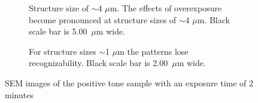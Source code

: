 \begin{figure}[ht]
\begin{subfigure}[t]{0.24\linewidth}
    	\label{fig:b2d7_q7}
    \end{subfigure}
    \hfill
    \begin{subfigure}[t]{0.24\linewidth}
    	\centering
    	\caption{Structure size of $\sim$4 $\mu$m. The effects of overexposure become pronounced at structure sizes of $\sim$4 $\mu$m. Black scale bar is 5.00~$\mu$m wide.}
    	\label{fig:b2d9_q9}
    \end{subfigure}
    \hfill
    \begin{subfigure}[t]{0.24\linewidth}
    	\centering
    	\caption{For structure sizes $\sim$1 $\mu$m the patterns lose recognizability. Black scale bar is 2.00~$\mu$m wide.}
    	\label{fig:b2d10_q11}
    \end{subfigure}
    \caption{SEM images of the positive tone sample with an exposure time of 2 minutes}
\end{figure}

